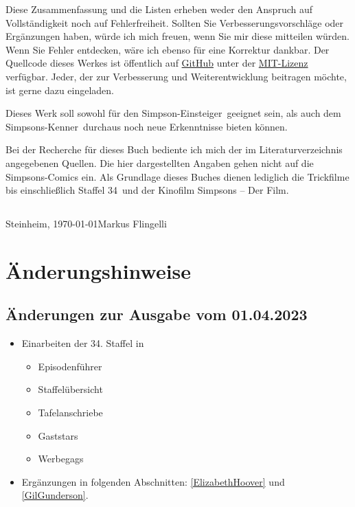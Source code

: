 \documentclass[pagesize,twoside,german]{scrbook}
\newcommand{\staffelAnzahl}{34}
\begin{document}
Diese Zusammenfassung und die Listen erheben weder den Anspruch auf Voll\-stän\-dig\-keit noch auf Fehlerfreiheit. Sollten Sie Verbesserungsvorschläge oder Er\-gänz\-un\-gen haben, würde ich mich freuen, wenn Sie mir diese mitteilen würden. Wenn Sie Fehler entdecken, wäre ich ebenso für eine Korrektur dankbar. Der Quellcode dieses Werkes ist öffentlich auf \href{https://github.com/mflingelli/simpsons}{GitHub} unter der \href{https://github.com/mflingelli/simpsons/blob/development/LICENSE.md}{MIT-Lizenz} verfügbar. Jeder, der zur Verbesserung und Weiterentwicklung beitragen möchte, ist gerne dazu eingeladen.

Dieses Werk soll sowohl für den \glqq Simpson-Einsteiger\grqq\ geeignet sein, als auch dem \glqq Simpsons-Kenner\grqq\ durchaus noch neue Erkenntnisse bieten können.

Bei der Recherche für dieses Buch bediente ich mich der im Literaturverzeichnis angegebenen Quellen. Die hier dargestellten Angaben gehen nicht auf die Simpsons-Comics ein. Als Grundlage dieses Buches dienen lediglich die Trickfilme bis einschließlich Staffel \staffelAnzahl\ und der Kinofilm \glqq Simpsons -- Der Film\grqq .

\subsection*{}
{
Steinheim, \today \hfill Markus Flingelli
}


\section*{Änderungshinweise}

\subsection*{Änderungen zur Ausgabe vom 01.04.2023}
\begin{itemize}
	\item Einarbeiten der 34. Staffel in
	\begin{itemize}
		\item Episodenführer
		\item Staffelübersicht
		\item Tafelanschriebe
		\item Gaststars
		\item Werbegags
	\end{itemize}
	\item Ergänzungen in folgenden Abschnitten: \ref{ElizabethHoover} und \ref{GilGunderson}.
\end{itemize}
\end{document}
